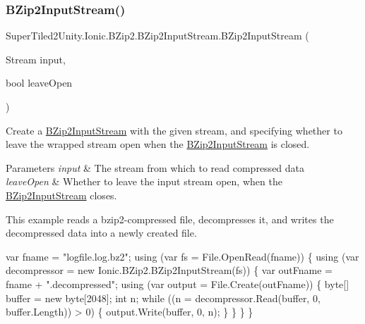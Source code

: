 \subsubsection{\texorpdfstring{B\+Zip2\+Input\+Stream()}{BZip2InputStream()}\hspace{0.1cm}{\footnotesize\ttfamily [2/2]}}
{\footnotesize\ttfamily Super\+Tiled2\+Unity.\+Ionic.\+B\+Zip2.\+B\+Zip2\+Input\+Stream.\+B\+Zip2\+Input\+Stream (\begin{DoxyParamCaption}\item[{Stream}]{input,  }\item[{bool}]{leave\+Open }\end{DoxyParamCaption})}



Create a \mbox{\hyperlink{class_super_tiled2_unity_1_1_ionic_1_1_b_zip2_1_1_b_zip2_input_stream}{B\+Zip2\+Input\+Stream}} with the given stream, and specifying whether to leave the wrapped stream open when the \mbox{\hyperlink{class_super_tiled2_unity_1_1_ionic_1_1_b_zip2_1_1_b_zip2_input_stream}{B\+Zip2\+Input\+Stream}} is closed. 


\begin{DoxyParams}{Parameters}
{\em input} & The stream from which to read compressed data\\
\hline
{\em leave\+Open} & Whether to leave the input stream open, when the \mbox{\hyperlink{class_super_tiled2_unity_1_1_ionic_1_1_b_zip2_1_1_b_zip2_input_stream}{B\+Zip2\+Input\+Stream}} closes. \\
\hline
\end{DoxyParams}


This example reads a bzip2-\/compressed file, decompresses it, and writes the decompressed data into a newly created file.


\begin{DoxyCode}
var fname = \textcolor{stringliteral}{"logfile.log.bz2"};
\textcolor{keyword}{using} (var fs = File.OpenRead(fname))
\{
    \textcolor{keyword}{using} (var decompressor = \textcolor{keyword}{new} Ionic.BZip2.BZip2InputStream(fs))
    \{
        var outFname = fname + \textcolor{stringliteral}{".decompressed"};
        \textcolor{keyword}{using} (var output = File.Create(outFname))
        \{
            byte[] buffer = \textcolor{keyword}{new} byte[2048];
            \textcolor{keywordtype}{int} n;
            \textcolor{keywordflow}{while} ((n = decompressor.Read(buffer, 0, buffer.Length)) > 0)
            \{
                output.Write(buffer, 0, n);
            \}
        \}
    \}
\}
\end{DoxyCode}
 

